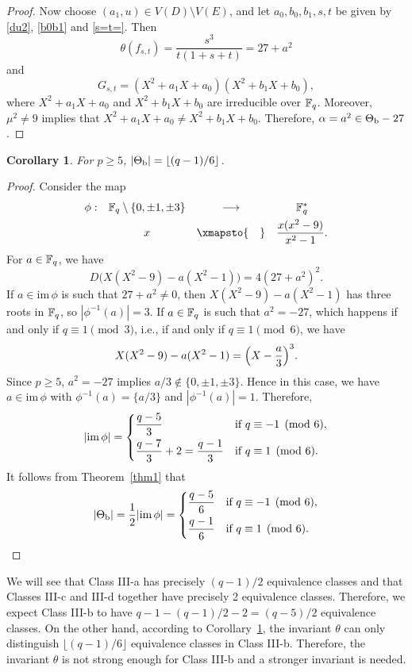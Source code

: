 \documentclass{amsart}
\newtheorem{cor}[thm]{Corollary}
\numberwithin{equation}{section}
\theoremstyle{definition}
\newcommand{\f}{\Bbb F}
\begin{document}
\begin{proof}
Now choose $(a_1,u)\in V(D)\setminus V(E)$, and let $a_0,b_0,b_1,s,t$ be given by \eqref{du2}, \eqref{b0b1} and \eqref{s=t=}. Then
\[
\theta(f_{s,t})=\frac{s^3}{t(1+s+t)}=27+a^2
\]
and 
\[
G_{s,t}=(X^2+a_1X+a_0)(X^2+b_1X+b_0),
\]
where $X^2+a_1X+a_0$ and $X^2+b_1X+b_0$ are irreducible over $\f_q$. Moreover, $\mu^2\ne 9$ implies that $X^2+a_1X+a_0\ne X^2+b_1X+b_0$. Therefore, $\alpha=a^2\in\Theta_{\rm b}-27$.  
\end{proof}

\begin{cor}\label{cor2}
For $p\ge 5$, $|\Theta_{\rm b}|=\lfloor(q-1)/6\rfloor$.
\end{cor}

\begin{proof}
Consider the map
\[
\begin{array}{cccc}
\phi:&\f_q\setminus\{0,\pm1,\pm3\}&\longrightarrow &\f_q^*\vspace{0.4em}\cr
&x&\xmapsto{\hspace{1em}} & \displaystyle\frac{x(x^2-9)}{x^2-1}.
\end{array}
\]
For $a\in\f_q$, we have
\[
D\bigl(X(X^2-9)-a(X^2-1)\bigr)=4(27+a^2)^2.
\]
If $a\in\text{im}\,\phi$ is such that $27+a^2\ne 0$, then $X(X^2-9)-a(X^2-1)$ has three roots in $\f_q$, so 
$|\phi^{-1}(a)|=3$.
If $a\in\f_q$ is such that $a^2=-27$, which happens if and only if $q\equiv 1\pmod 3$, i.e., if and only if $q\equiv 1\pmod 6$, we have 
\[
X(X^2-9)-a(X^2-1)=\Bigl(X-\frac a3\Bigr)^3.
\]
Since $p\ge 5$, $a^2=-27$ implies $a/3\notin\{0,\pm1,\pm3\}$. Hence in this case, we have $a\in \text{im}\,\phi$ with $\phi^{-1}(a)=\{a/3\}$ and $|\phi^{-1}(a)|=1$. 
Therefore,
\[
|\text{im}\,\phi|=
\begin{cases}
\displaystyle\frac{q-5}3&\text{if}\ q\equiv-1\pmod 6,\vspace{0.4em}\cr
\displaystyle\frac{q-7}3+2=\displaystyle\frac{q-1}3&\text{if}\ q\equiv 1\pmod 6.
\end{cases}
\]
It follows from Theorem~\ref{thm1} that
\[
|\Theta_{\rm b}|=\frac 12|\text{im}\,\phi|=
\begin{cases}
\displaystyle\frac{q-5}6&\text{if}\ q\equiv-1\pmod 6,\vspace{0.4em}\cr
\displaystyle\frac{q-1}6&\text{if}\ q\equiv 1\pmod 6.
\end{cases}
\]
\end{proof}

We will see that Class III-a has precisely $(q-1)/2$ equivalence classes and that Classes III-c and III-d together have precisely 2 equivalence classes. Therefore, we expect Class III-b to have $q-1-(q-1)/2-2=(q-5)/2$ equivalence classes. On the other hand, according to Corollary~\ref{cor2}, the invariant $\theta$ can only distinguish $\lfloor(q-1)/6\rfloor$ equivalence classes in Class III-b. Therefore, the invariant $\theta$ is not strong enough for Class III-b and a stronger invariant is needed.
\end{document}
